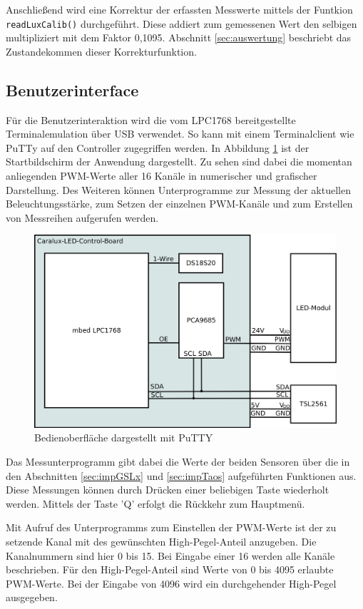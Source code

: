 \documentclass[a4paper,12pt]{scrartcl}
\begin{document}
Anschließend wird eine Korrektur der erfassten Messwerte mittels der Funtkion \texttt{readLuxCalib()} durchgeführt. Diese addiert zum gemessenen Wert den selbigen multipliziert mit dem Faktor 0,1095. Abschnitt \ref{sec:auswertung} beschriebt das Zustandekommen dieser Korrekturfunktion.

\subsection{Benutzerinterface}
Für die Benutzerinteraktion wird die vom LPC1768 bereitgestellte Terminalemulation über USB verwendet. So kann mit einem Terminalclient wie PuTTy auf den Controller zugegriffen werden. In Abbildung \ref{fig:gui} ist der Startbildschirm der Anwendung dargestellt. Zu sehen sind dabei die momentan anliegenden PWM-Werte aller 16 Kanäle in numerischer und grafischer Darstellung. Des Weiteren können Unterprogramme zur Messung der aktuellen Beleuchtungsstärke, zum Setzen der einzelnen PWM-Kanäle und zum Erstellen von Messreihen aufgerufen werden.

\begin{figure}[htb]
\begin{center}
\includegraphics[width=0.7\hsize]{./schematics/blockDiagramm.png}
\end{center}
\caption[Bedienoberfläche dargestellt mit PuTTY, Quelle: Autoren]{\label{fig:gui}Bedienoberfläche dargestellt mit PuTTY}
\end{figure}

Das Messunterprogramm gibt dabei die Werte der beiden Sensoren über die in den Abschnitten \ref{sec:impGSLx} und \ref{sec:impTaos} aufgeführten Funktionen aus. Diese Messungen können durch Drücken einer beliebigen Taste wiederholt werden. Mittels der Taste ’Q’ erfolgt die Rückkehr zum Hauptmenü.

Mit Aufruf des Unterprogramms zum Einstellen der PWM-Werte ist der zu setzende Kanal mit des gewünschten High-Pegel-Anteil anzugeben. Die Kanalnummern sind hier 0 bis 15. Bei Eingabe einer 16 werden alle Kanäle beschrieben. Für den High-Pegel-Anteil sind Werte von 0 bis 4095 erlaubte PWM-Werte. Bei der Eingabe von 4096 wird ein durchgehender High-Pegel ausgegeben.
\end{document}
